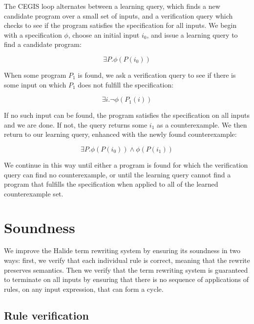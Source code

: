 \documentclass[acmsmall,review,anonymous]{acmart}\settopmatter{printfolios=true,printccs=false,printacmref=false}
\begin{document}
The CEGIS loop alternates between a learning query, which finds a new candidate program over a small set of inputs, and a verification query which checks to see if the program satisfies the specification for all inputs. We begin with a specification $\phi$, choose an initial input $i_0$, and issue a learning query to find a candidate program:

$$\exists P . \phi(P(i_0))$$

When some program $P_1$ is found, we ask a verification query to see if there is some input on which $P_1$ does not fulfill the specification:

$$\exists i . \neg \phi(P_1(i))$$

If no such input can be found, the program satisfies the specification on all inputs and we are done. If not, the query returns some $i_1$ as a counterexample. We then return to our learning query, enhanced with the newly found counterexample:

$$\exists P . \phi(P(i_0)) \wedge \phi(P(i_1))$$

We continue in this way until either a program is found for which the verification query can find no counterexample, or until the learning query cannot find a program that fulfills the specification when applied to all of the learned counterexample set.

\section{Soundness}
\label{sec:soundness}

We improve the Halide term rewriting system by ensuring its soundness in
two ways: first, we verify that each individual rule is correct, meaning that the
rewrite preserves semantics. Then we verify that the term rewriting system is
guaranteed to terminate on all inputs by ensuring that there is no sequence of
applications of rules, on any input expression, that can form a cycle.

\subsection{Rule verification}
\end{document}
